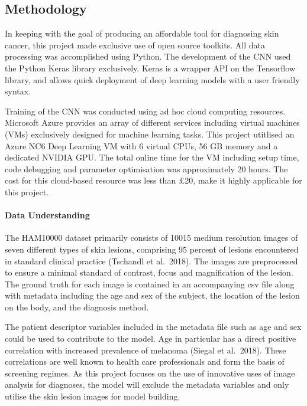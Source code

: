 \documentclass[11pt]{article}
\begin{document}
    \hypertarget{methodology}{%
\subsection{Methodology}\label{methodology}}

In keeping with the goal of producing an affordable tool for diagnosing
skin cancer, this project made exclusive use of open source toolkits.
All data processing was accomplished using Python. The development of
the CNN used the Python Keras library exclusively. Keras is a wrapper
API on the Tensorflow library, and allows quick deployment of deep
learning models with a user friendly syntax.

Training of the CNN was conducted using ad hoc cloud computing
resources. Microsoft Azure provides an array of different services
including virtual machines (VMs) exclusively designed for machine
learning tasks. This project utitlised an Azure NC6 Deep Learning VM
with 6 virtual CPUs, 56 GB memory and a dedicated NVIDIA GPU. The total
online time for the VM including setup time, code debugging and
parameter optimisation was approximately 20 hours. The cost for this
cloud-based resource was less than £20, make it highly applicable for
this project.

\hypertarget{data-understanding}{%
\paragraph{Data Understanding}\label{data-understanding}}

The HAM10000 dataset primarily consists of 10015 medium resolution
images of seven different types of skin lesions, comprising 95 percent
of lesions encountered in standard clinical practice (Tschandl et
al.~2018). The images are preprocessed to ensure a minimal standard of
contrast, focus and magnification of the lesion. The ground truth for
each image is contained in an accompanying csv file along with metadata
including the age and sex of the subject, the location of the lesion on
the body, and the diagnosis method.

The patient descriptor variables included in the metadata file such as
age and sex could be used to contribute to the model. Age in particular
has a direct positive correlation with increased prevalence of melanoma
(Siegal et al.~2018). These correlations are well known to health care
professionals and form the basis of screening regimes. As this project
focuses on the use of innovative uses of image analysis for diagnoses,
the model will exclude the metadata variables and only utilise the skin
lesion images for model building.
\end{document}
